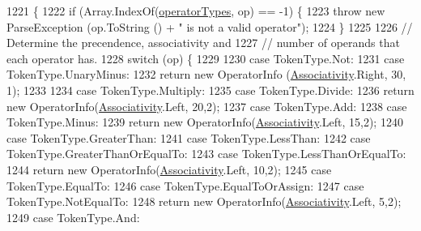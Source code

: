 \begin{DoxyCode}
1221                                                                        \{
1222                 \textcolor{keywordflow}{if} (Array.IndexOf(\hyperlink{a00117_a8dca7db3b76b8c358aba6068274e07df}{operatorTypes}, op) == -1) \{
1223                     \textcolor{keywordflow}{throw} \textcolor{keyword}{new} ParseException (op.ToString () + \textcolor{stringliteral}{" is not a valid operator"});
1224                 \}
1225 
1226                 \textcolor{comment}{// Determine the precendence, associativity and}
1227                 \textcolor{comment}{// number of operands that each operator has.}
1228                 \textcolor{keywordflow}{switch} (op) \{
1229 
1230                 \textcolor{keywordflow}{case} TokenType.Not:
1231                 \textcolor{keywordflow}{case} TokenType.UnaryMinus:
1232                     \textcolor{keywordflow}{return} \textcolor{keyword}{new} OperatorInfo (\hyperlink{a00117_a83fa1b8db0e6678006920812b6f33f62}{Associativity}.Right, 30, 1);
1233 
1234                 \textcolor{keywordflow}{case} TokenType.Multiply:
1235                 \textcolor{keywordflow}{case} TokenType.Divide:
1236                     \textcolor{keywordflow}{return} \textcolor{keyword}{new} OperatorInfo(\hyperlink{a00117_a83fa1b8db0e6678006920812b6f33f62}{Associativity}.Left, 20,2);
1237                 \textcolor{keywordflow}{case} TokenType.Add:
1238                 \textcolor{keywordflow}{case} TokenType.Minus:
1239                     \textcolor{keywordflow}{return} \textcolor{keyword}{new} OperatorInfo(\hyperlink{a00117_a83fa1b8db0e6678006920812b6f33f62}{Associativity}.Left, 15,2);
1240                 \textcolor{keywordflow}{case} TokenType.GreaterThan:
1241                 \textcolor{keywordflow}{case} TokenType.LessThan:
1242                 \textcolor{keywordflow}{case} TokenType.GreaterThanOrEqualTo:
1243                 \textcolor{keywordflow}{case} TokenType.LessThanOrEqualTo:
1244                     \textcolor{keywordflow}{return} \textcolor{keyword}{new} OperatorInfo(\hyperlink{a00117_a83fa1b8db0e6678006920812b6f33f62}{Associativity}.Left, 10,2);
1245                 \textcolor{keywordflow}{case} TokenType.EqualTo:
1246                 \textcolor{keywordflow}{case} TokenType.EqualToOrAssign:
1247                 \textcolor{keywordflow}{case} TokenType.NotEqualTo:
1248                     \textcolor{keywordflow}{return} \textcolor{keyword}{new} OperatorInfo(\hyperlink{a00117_a83fa1b8db0e6678006920812b6f33f62}{Associativity}.Left, 5,2);
1249                 \textcolor{keywordflow}{case} TokenType.And:

\end{DoxyCode}
